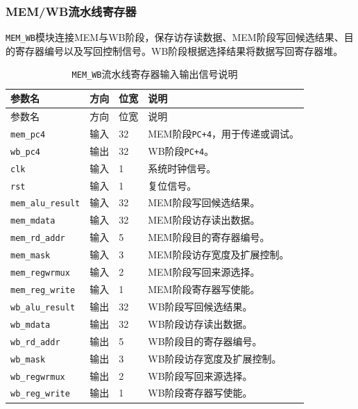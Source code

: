 \documentclass[12pt,a4paper]{ctexart}
\newcommand{\code}[1]{\texttt{#1}}
\begin{document}
\subsubsection{MEM/WB流水线寄存器}

\code{MEM\_WB}模块连接MEM与WB阶段，保存访存读数据、MEM阶段写回候选结果、目的寄存器编号以及写回控制信号。WB阶段根据选择结果将数据写回寄存器堆。

{\footnotesize
\renewcommand{\arraystretch}{1.12}
\begin{longtable}{p{3.2cm}p{1.5cm}p{2.1cm}p{7.0cm}}
	\caption{\code{MEM\_WB}流水线寄存器输入输出信号说明}                        \\
	\toprule
	参数名                     & 方向 & 位宽 & 说明                        \\
	\midrule
	\endfirsthead
	\toprule
	参数名                     & 方向 & 位宽 & 说明                        \\
	\midrule
	\endhead
	\code{mem\_pc4}         & 输入 & 32 & MEM阶段\code{PC+4}，用于传递或调试。 \\
	\code{wb\_pc4}          & 输出 & 32 & WB阶段\code{PC+4}。          \\
	\code{clk}              & 输入 & 1  & 系统时钟信号。                   \\
	\code{rst}              & 输入 & 1  & 复位信号。                     \\
	\code{mem\_alu\_result} & 输入 & 32 & MEM阶段写回候选结果。              \\
	\code{mem\_mdata}       & 输入 & 32 & MEM阶段访存读出数据。              \\
	\code{mem\_rd\_addr}    & 输入 & 5  & MEM阶段目的寄存器编号。             \\
	\code{mem\_mask}        & 输入 & 3  & MEM阶段访存宽度及扩展控制。           \\
	\code{mem\_regwrmux}    & 输入 & 2  & MEM阶段写回来源选择。              \\
	\code{mem\_reg\_write}  & 输入 & 1  & MEM阶段寄存器写使能。              \\
	\code{wb\_alu\_result}  & 输出 & 32 & WB阶段写回候选结果。               \\
	\code{wb\_mdata}        & 输出 & 32 & WB阶段访存读出数据。               \\
	\code{wb\_rd\_addr}     & 输出 & 5  & WB阶段目的寄存器编号。              \\
	\code{wb\_mask}         & 输出 & 3  & WB阶段访存宽度及扩展控制。            \\
	\code{wb\_regwrmux}     & 输出 & 2  & WB阶段写回来源选择。               \\
	\code{wb\_reg\_write}   & 输出 & 1  & WB阶段寄存器写使能。               \\
	\bottomrule
\end{longtable}
}
\end{document}
